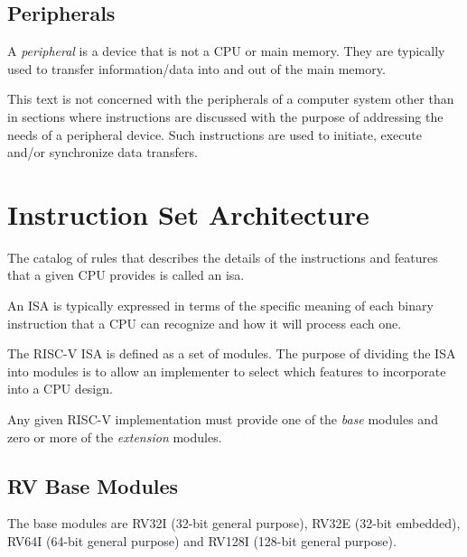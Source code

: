 \subsection{Peripherals}

A {\em peripheral} is a device that is not a CPU or main memory.  They are 
typically used to transfer information/data into and out of the 
main memory.

This text is not concerned with the peripherals of a computer
system other than in sections where instructions are discussed with the
purpose of addressing the needs of a peripheral device.  Such
instructions are used to initiate, execute and/or synchronize data transfers.


\section{Instruction Set Architecture}

The catalog of rules that describes the details of the instructions 
and features that a given CPU provides is called an \acrfull{isa}.

An ISA is typically expressed in terms of the specific meaning of
each binary instruction that a CPU can recognize and how it will
process each one.

The RISC-V ISA is defined as a set of modules.  The purpose of
dividing the ISA into modules is to allow an implementer to select which 
features to incorporate into a CPU design.\cite[p.~4]{rvismv1v22:2017}

Any given RISC-V implementation must provide one of the {\em base}
modules and zero or more of the {\em extension} modules.\cite[p.~4]{rvismv1v22:2017}

\subsection{RV Base Modules}

The base modules are RV32I (32-bit general purpose), 
RV32E (32-bit embedded), RV64I (64-bit general purpose) 
and RV128I (128-bit general purpose).\cite[p.~4]{rvismv1v22:2017}

